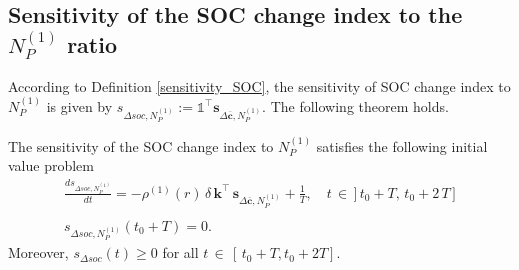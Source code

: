 \subsection{Sensitivity of the SOC change index to the $N_P^{(1)}$ ratio}\label{subsection:sensitivity to N}
According to Definition \ref{sensitivity_SOC}, the sensitivity  of SOC change index  to $N_P^{(1)}$
is given by $s_{\Delta soc,N_P^{(1)}}:=  \mathds{1}^\intercal \mathbf{s}_{\Delta \mathbf{\overline c},N_P^{(1)}}$. The following theorem holds.
\begin{theorem}\label{thm: sensitivity to N}
 The sensitivity of the SOC change index  to  $N_P^{(1)}$ satisfies the following initial value problem
 \begin{equation}\label{eq:ode delta SOC sensitivity to N}
\begin{array}{l}\displaystyle \frac{d s_{\Delta soc,N_P^{(1)}}}{dt}  = -\rho^{(1)}(r)\, \delta\, \mathbf{k}^\intercal\, \mathbf{s}_{\Delta \mathbf{\overline c},N_P^{(1)}}+\displaystyle \frac{1}{T},\quad t\,\in\,]\,t_0+T ,\,t_0+2\,T\,]
% 
\\\\
 s_{\Delta soc,N_P^{(1)}}(t_0+T)=0.
\end{array}
\end{equation}
Moreover, $s_{\Delta soc}(t)\geq 0$ for all $t\,\in \,[\,t_0+T,t_0+2T]$. 
 \end{theorem}
